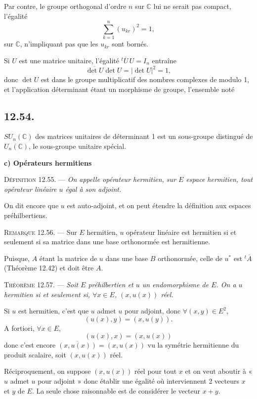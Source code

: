 Par contre, le groupe orthogonal d'ordre $n$ sur $\mathbb C$ lui ne serait pas compact, l'égalité
\[
\sum_{k=1}^n(u_{kr})^2=1,
\]
sur $\mathbb C$, n'impliquant pas que les $u_{kr}$ sont bornés.

Si $U$ est une matrice unitaire, l'égalité ${}^t\!\overline U\,U=I_n$ entraîne
\[
\overline{\det U}\det U=|\det U|^2=1,
\]
donc $\det U$ est dans le groupe multiplicatif des nombres complexes de modulo 1, et l'application déterminant étant un morphisme de groupe, l'ensemble noté

\subsection*{12.54.}
$SU_n(\mathbb C)$ des matrices unitaires de déterminant 1 est un sous-groupe distingué de $U_n(\mathbb C)$, le sous-groupe unitaire spécial.

\medskip\noindent\textbf{c) Opérateurs hermitiens}

\medskip\noindent\textsc{Définition 12.55.} --- \emph{On appelle opérateur hermitien, sur $E$ espace hermitien, tout opérateur linéaire $u$ égal à son adjoint.}

On dit encore que $u$ est auto-adjoint, et on peut étendre la définition aux espaces préhilbertiens.

\medskip\noindent\textsc{Remarque 12.56.} --- Sur $E$ hermitien, $u$ opérateur linéaire est hermitien si et seulement si sa matrice dans une base orthonormée est hermitienne.

Puisque, $A$ étant la matrice de $u$ dans une base $B$ orthonormée, celle de $u^*$ est ${}^t\!\overline A$ (Théorème 12.42) et doit être $A$.

\medskip\noindent\textsc{Théorème 12.57.} --- \emph{Soit $E$ préhilbertien et $u$ un endomorphisme de $E$. On a $u$ hermitien si et seulement si, $\forall x\in E$, $(x,u(x))$ réel.}

Si $u$ est hermitien, c'est que $u$ admet $u$ pour adjoint, donc $\forall(x,y)\in E^2$,
\[
(u(x),y)=(x,u(y)).
\]
A fortiori, $\forall x\in E$,
\[
(u(x),x)=(x,u(x))
\]
donc c'est encore $\overline{(x,u(x))}=(x,u(x))$ vu la symétrie hermitienne du produit scalaire, soit $(x,u(x))$ réel.

Réciproquement, on suppose $(x,u(x))$ réel pour tout $x$ et on veut aboutir à « $u$ admet $u$ pour adjoint » donc établir une égalité où interviennent 2 vecteurs $x$ et $y$ de $E$. La seule chose raisonnable est de considérer le vecteur $x+y$.

